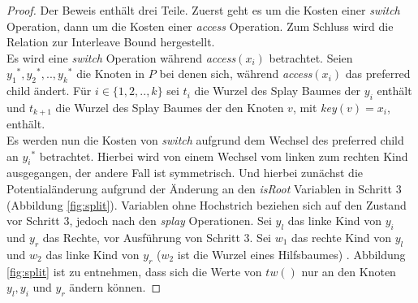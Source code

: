 \documentclass[a4paper,12pt]{article}
\begin{document}
\begin{proof}
	Der Beweis enthält drei Teile. Zuerst geht es um die Kosten einer \textit{switch} Operation, dann um die Kosten einer  \textit{access} Operation. Zum Schluss wird die Relation zur Interleave Bound hergestellt.\\
	Es wird eine \textit{switch} Operation während \textit{access}$\left(x_i\right)$ betrachtet. Seien ${y_1}^*, {y_2}^*,..,{y_k}^*$ die Knoten in $P$ bei denen sich, während  \textit{access}$\left(x_i\right)$ das preferred child ändert.  Für $i \in \{1, 2,.., k\}$ sei $t_i$ die Wurzel des Splay Baumes der $y_i$ enthält und $t_{k+1}$ die Wurzel des Splay Baumes der den Knoten $v$, mit \textit{key}$\left(v\right) = x_i$, enthält.\\
	Es werden nun die Kosten von \textit{switch} aufgrund dem Wechsel des preferred child an ${y_i}^*$ betrachtet. Hierbei wird von einem Wechsel vom linken zum rechten Kind ausgegangen, der andere Fall ist symmetrisch. Und hierbei zunächst die Potentialänderung aufgrund der Änderung an den \textit{isRoot} Variablen in Schritt 3 (Abbildung \ref{fig:split}). Variablen ohne Hochstrich beziehen sich auf den Zustand vor Schritt 3, jedoch nach den \textit{splay} Operationen. Sei $y_l$ das linke Kind von $y_i$ und $y_r$ das Rechte, vor Ausführung von Schritt 3. Sei $w_1$ das rechte Kind von $y_l$ und $w_2$ das linke Kind von $y_r$  ($w_2$ ist die Wurzel eines Hilfsbaumes) . Abbildung \ref{fig:split} ist zu entnehmen, dass sich die Werte von $\mathit{tw}\left(\right)$ nur an den Knoten $y_l, y_i$ und $y_r$ ändern können.
	 

\end{proof}
\end{document}
